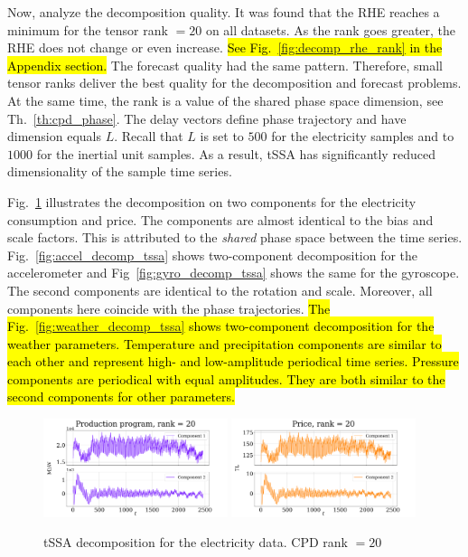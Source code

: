 \documentclass[referee, pdflatex, sn-mathphys-num]{sn-jnl}
\theoremstyle{definition}
\theoremstyle{plain}
\begin{document}
	Now, analyze the decomposition quality. It was found that the RHE reaches a minimum for the tensor rank $ = 20 $ on all datasets. As the rank goes greater, the RHE does not change or even increase. \hl{See Fig.~{\ref{fig:decomp_rhe_rank}} in the Appendix section.} The forecast quality had the same pattern. Therefore, small tensor ranks deliver the best quality for the decomposition and forecast problems. At the same time, the rank is a value of the shared phase space dimension, see Th.~\ref{th:cpd_phase}. The delay vectors define phase trajectory and have dimension equals $ L $. Recall that $ L $ is set to $ 500 $ for the electricity samples and to $ 1000 $ for the inertial unit samples. As a result, tSSA has significantly reduced dimensionality of the sample time series.
	
	Fig.~\ref{fig:electr_decomp_tssa} illustrates the decomposition on two components for the electricity consumption and price. The components are almost identical to the bias and scale factors. This is attributed to the \emph{shared} phase space between the time series. Fig.~\ref{fig:accel_decomp_tssa} shows two-component decomposition for the accelerometer and Fig~\ref{fig:gyro_decomp_tssa} shows the same for the gyroscope. The second components are identical to the rotation and scale. Moreover, all components here coincide with the phase trajectories. \hl{The Fig.~{\ref{fig:weather_decomp_tssa}} shows two-component decomposition for the weather parameters. Temperature and precipitation components are similar to each other and represent high- and low-amplitude periodical time series. Pressure components are periodical with equal amplitudes. They are both similar to the second components for other parameters.} 
	
	\begin{figure}[h]
		\centering
		\includegraphics[width=0.48\textwidth, keepaspectratio]{Production program_decomp.png}
		\includegraphics[width=0.48\textwidth, keepaspectratio]{Price_decomp.png}
		\caption{tSSA decomposition for the electricity data. CPD rank $ = 20 $}\label{fig:electr_decomp_tssa}
	\end{figure}
	
\end{document}
